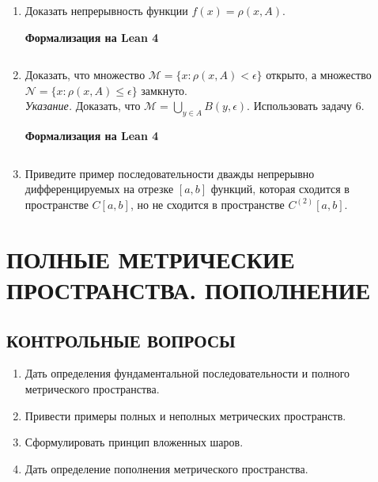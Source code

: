 \documentclass[12pt,a4paper]{article}
\begin{document}
\begin{enumerate}
\begin{center}\small\textbf{Формализация на Lean 4}\end{center}
\inputminted{lean}{FunAn/Section07_MetricSpaces/Task05.lean}

\newpage
\item Доказать непрерывность функции $f(x) = \rho(x, A)$.


\begin{center}\small\textbf{Формализация на Lean 4}\end{center}
\inputminted{lean}{FunAn/Section07_MetricSpaces/Task06.lean}

\newpage
\item Доказать, что множество $\mathcal{M} = \{x : \rho(x, A) < \epsilon\}$ открыто, а множество $\mathcal{N} = \{x : \rho(x, A) \le \epsilon\}$ замкнуто.\\
\textit{Указание.} Доказать, что $\mathcal{M} = \bigcup_{y\in A} B(y, \epsilon)$. Использовать задачу 6.


\begin{center}\small\textbf{Формализация на Lean 4}\end{center}
\inputminted{lean}{FunAn/Section07_MetricSpaces/Task07.lean}

\newpage

\item Приведите пример последовательности дважды непрерывно дифференцируемых на отрезке $[a, b]$ функций, которая сходится в пространстве $C[a, b]$, но не сходится в пространстве $C^{(2)}[a, b]$.
\end{enumerate}

\section{ПОЛНЫЕ МЕТРИЧЕСКИЕ ПРОСТРАНСТВА. ПОПОЛНЕНИЕ}

\subsection*{КОНТРОЛЬНЫЕ ВОПРОСЫ}
\begin{enumerate}
\item Дать определения фундаментальной последовательности и полного метрического пространства.
\item Привести примеры полных и неполных метрических пространств.
\item Сформулировать принцип вложенных шаров.
\item Дать определение пополнения метрического пространства.
\end{enumerate}
\end{document}
